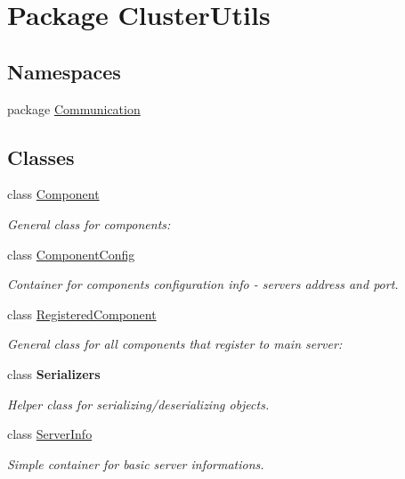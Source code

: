 \hypertarget{namespace_cluster_utils}{}\section{Package Cluster\+Utils}
\label{namespace_cluster_utils}
\subsection*{Namespaces}
\begin{DoxyCompactItemize}
\item 
package \hyperlink{namespace_cluster_utils_1_1_communication}{Communication}
\end{DoxyCompactItemize}
\subsection*{Classes}
\begin{DoxyCompactItemize}
\item 
class \hyperlink{class_cluster_utils_1_1_component}{Component}
\begin{DoxyCompactList}\small\item\em General class for components\+: \end{DoxyCompactList}\item 
class \hyperlink{class_cluster_utils_1_1_component_config}{Component\+Config}
\begin{DoxyCompactList}\small\item\em Container for components\textquotesingle{} configuration info -\/ server\textquotesingle{}s address and port. \end{DoxyCompactList}\item 
class \hyperlink{class_cluster_utils_1_1_registered_component}{Registered\+Component}
\begin{DoxyCompactList}\small\item\em General class for all components that register to main server\+: \end{DoxyCompactList}\item 
class {\bfseries Serializers}
\begin{DoxyCompactList}\small\item\em Helper class for serializing/deserializing objects. \end{DoxyCompactList}\item 
class \hyperlink{class_cluster_utils_1_1_server_info}{Server\+Info}
\begin{DoxyCompactList}\small\item\em Simple container for basic server informations. \end{DoxyCompactList}\end{DoxyCompactItemize}
